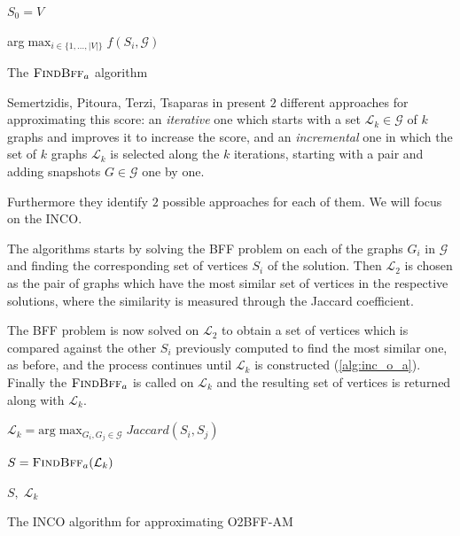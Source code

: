 \begin{algorithm}
	\SetAlgoLined
	$S_{0} = V$ \;


	\Return arg$\max _{i \in \{ 1, \dots, |V|\}} f(S_{i}, \mathcal{G})  $
	\caption{The $\textsc{FindBff}_{a} $ algorithm}
	\label{alg:findbff_a}
\end{algorithm}

Semertzidis, Pitoura, Terzi, Tsaparas in \cite{semertzidis2019finding} present
$2$ different approaches for approximating this score: an \emph{iterative} one
which starts with a set $\mathcal{L} _{k} \in \mathcal{G} $ of $k$ graphs and improves it to
increase the score, and an \emph{incremental} one in which the set of $k$
graphs $\mathcal{L}_{k} $ is selected along the $k$ iterations, starting with a
pair and adding snapshots $G \in \mathcal{G} $ one by one.

Furthermore they identify $2$ possible approaches for each of them. We will
focus on the \acrfull{INCO}.

The algorithms starts by solving the \acrshort{BFF} problem on each of the
graphs $G_{i} $ in $\mathcal{G} $ and finding the corresponding set of vertices
$S_{i} $ of the solution. Then $\mathcal{L}_{2}  $ is chosen as the pair of graphs which
have the most similar set of vertices in the respective solutions, where the
similarity is measured through the Jaccard coefficient.

The \acrshort{BFF} problem is now solved on $\mathcal{L} _{2} $ to obtain a set
of vertices which is compared against the other $S_i$ previously computed to
find the most similar one, as before, and the process continues until
$\mathcal{L}_{k} $ is constructed (\autoref{alg:inc_o_a}). Finally the
$\textsc{FindBff}_{a} $ is called on $\mathcal{L}_{k}  $ and the resulting set of
vertices is returned along with $\mathcal{L}_{k}  $.

\begin{algorithm}[H]
	\SetAlgoLined
	$\mathcal{L}_{k} = \text{arg}\max_{G_{i}, G_{j} \in \mathcal{G}}
		Jaccard(S_i, S_j) $ \;


	$S = \textsc{FindBff}_{a} (\mathcal{L}_{k}) $ \;

	\Return $S, \; \mathcal{L}_{k}  $ \;
	\caption{The \acrshort{INCO} algorithm for approximating
		\acrshort{O2BFF}-AM}
	\label{alg:inc_o_a}
\end{algorithm}

